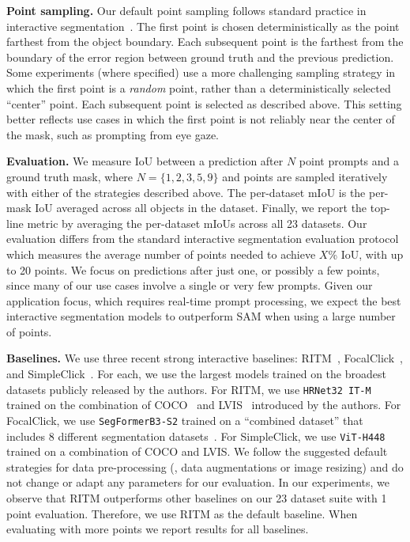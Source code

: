 \documentclass[10pt,twocolumn,letterpaper]{article}
\renewcommand{\paragraph}[1]{\vspace{1.25mm}\noindent\textbf{#1}}
\newcommand{\sam}{SAM\xspace}
\begin{document}
\paragraph{Point sampling.} Our default point sampling follows standard practice in interactive segmentation~\cite{xu2016deep,li2018interactive,sofiiuk2022reviving}. The first point is chosen deterministically as the point farthest from the object boundary. Each subsequent point is the farthest from the boundary of the error region between ground truth and the previous prediction. Some experiments (where specified) use a more challenging sampling strategy in which the first point is a \emph{random} point, rather than a deterministically selected ``center'' point. Each subsequent point is selected as described above. This setting better reflects use cases in which the first point is not reliably near the center of the mask, such as prompting from eye gaze.

\paragraph{Evaluation.} We measure IoU between a prediction after $N$ point prompts and a ground truth mask, where $N=\{1,2,3,5,9\}$ and points are sampled iteratively with either of the strategies described above. The per-dataset mIoU is the per-mask IoU averaged across all objects in the dataset. Finally, we report the top-line metric by averaging the per-dataset mIoUs across all 23 datasets. Our evaluation differs from the standard interactive segmentation evaluation protocol which measures the average number of points needed to achieve $X$\% IoU, with up to 20 points. We focus on predictions after just one, or possibly a few points, since many of our use cases involve a single or very few prompts. Given our application focus, which requires real-time prompt processing, we expect the best interactive segmentation models to outperform \sam when using a large number of points.

\paragraph{Baselines.} We use three recent strong interactive baselines: RITM~\cite{sofiiuk2022reviving}, FocalClick~\cite{chen2022focalclick}, and SimpleClick~\cite{liu2022simpleclick}. For each, we use the largest models trained on the broadest datasets publicly released by the authors. For RITM, we use \mbox{\tt HRNet32 IT-M} trained on the combination of COCO~\cite{Lin2014} and LVIS~\cite{Gupta2019} introduced by the authors. For FocalClick, we use {\tt SegFormerB3-S2} trained on a ``combined dataset'' that includes 8 different segmentation datasets~\cite{chen2022focalclick}. For SimpleClick, we use {\tt ViT-H448} trained on a combination of COCO and LVIS. We follow the suggested default strategies for data pre-processing (\ie, data augmentations or image resizing) and do not change or adapt any parameters for our evaluation. In our experiments, we observe that RITM outperforms other baselines on our 23 dataset suite with 1 point evaluation. Therefore, we use RITM as the default baseline. When evaluating with more points we report results for all baselines.
\end{document}
